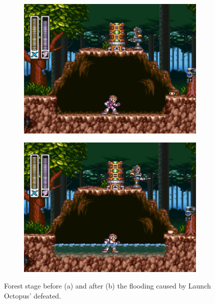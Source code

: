 \begin{figure}[htp]
	\centering
	\begin{subfigure}{0.4\linewidth}
		\centering
		\includegraphics[width=\linewidth]{figures/X1/Sting_chameleon/Sting_no_water.jpg}
		\caption{}
	\end{subfigure}
	\begin{subfigure}{0.4\linewidth}
		\centering
		\includegraphics[width=\linewidth]{figures/X1/Sting_chameleon/Sting_water.jpg}
		\caption{}
	\end{subfigure}
	\caption{Forest stage before (a) and after (b) the flooding caused by Launch Octopus' defeated.}
\end{figure}

